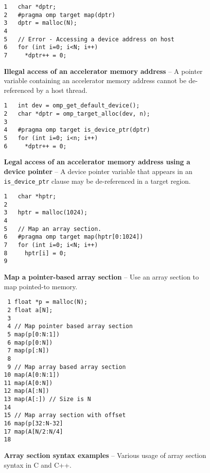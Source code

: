 \begin{figure*}[!tb]
\begin{verbatim}
1   char *dptr;
2   #pragma omp target map(dptr)
3   dptr = malloc(N);
4
5   // Error - Accessing a device address on host
6   for (int i=0; i<N; i++)
7     *dptr++ = 0;
\end{verbatim}
\caption{ \textbf {Illegal access of an accelerator memory address} -- \small
          A pointer variable containing an accelerator memory address 
          cannot be de-referenced by a host thread.
         }
\label{figure:chapter6-devptr2}
\end{figure*}


\begin{figure*}[!tb]
\begin{verbatim}
1   int dev = omp_get_default_device();
2   char *dptr = omp_target_alloc(dev, n);
3 
4   #pragma omp target is_device_ptr(dptr)
5   for (int i=0; i<n; i++)
6     *dptr++ = 0;
\end{verbatim}
\caption{ \textbf {Legal access of an accelerator memory address using a device pointer} -- \small
          A device pointer variable that appears in an \texttt{is\_device\_ptr} clause 
          may be de-referenced in a target region.
        }
\label{figure:chapter6-devptr3}
\end{figure*}


\begin{figure*}[!tbhp]
\begin{verbatim}
1   char *hptr;
2
3   hptr = malloc(1024);
4
5   // Map an array section.
6   #pragma omp target map(hptr[0:1024])
7   for (int i=0; i<N; i++)
8     hptr[i] = 0;
9   
\end{verbatim}
\caption{ \textbf {Map a pointer-based array section} -- \small
          Use an array section to map pointed-to memory.
         }
\label{figure:chapter6-array-sections1}
\end{figure*}


\begin{figure*}[!tbhp]
\begin{verbatim}
 1 float *p = malloc(N);
 2 float a[N];
 3
 4 // Map pointer based array section
 5 map(p[0:N:1]) 
 6 map(p[0:N])
 7 map(p[:N])
 8
 9 // Map array based array section
10 map(A[0:N:1])
11 map(A[0:N])
12 map(A[:N])
13 map(A[:]) // Size is N
14 
15 // Map array section with offset
16 map(p[32:N-32]
17 map(A[N/2:N/4]
18
\end{verbatim}
\caption{ \textbf {Array section syntax examples} -- \small
          Various usage of array section syntax in C and C++.
         }
\label{figure:chapter6-map-ptr1}
\end{figure*}


